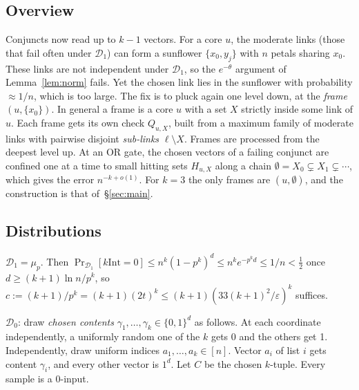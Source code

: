 \documentclass[11pt,a4paper]{article}
\theoremstyle{plain}
\theoremstyle{definition}
\theoremstyle{remark}
\newcommand{\kInt}{k\mathrm{Int}}
\newcommand{\Dz}{\mathcal{D}_0}
\newcommand{\Do}{\mathcal{D}_1}
\newcommand{\ones}{1^d}
\begin{document}
\subsection{Overview}
Conjuncts now read up to $k-1$ vectors. For a core $u$, the moderate links (those that fail often under $\Do$) can
form a sunflower $\{x_0,y_j\}$ with $n$ petals sharing $x_0$. These links are not independent under $\Do$, so the
$e^{-\theta}$ argument of Lemma~\ref{lem:norm} fails. Yet the chosen link lies in the sunflower with probability
$\approx1/n$, which is too large. The fix is to pluck again one level down, at the \emph{frame} $(u,\{x_0\})$.
In general a frame is a core $u$ with a set $X$ strictly inside some link of $u$. Each frame gets its own check
$Q_{u,X}$, built from a maximum family of moderate links with pairwise disjoint \emph{sub-links} $\ell\setminus X$.
Frames are processed from the deepest level up. At an OR gate, the chosen vectors of a failing conjunct are confined
one at a time to small hitting sets $H_{u,X}$ along a chain $\emptyset=X_0\subsetneq X_1\subsetneq\cdots$, which
gives the error $n^{-k+o(1)}$. For $k=3$ the only frames are $(u,\emptyset)$, and the construction is that
of~\S\ref{sec:main}.

\subsection{Distributions}
$\Do=\mu_p$. Then $\Pr_{\Do}[\kInt=0]\le n^k(1-p^k)^d\le n^ke^{-p^kd}\le1/n<\frac12$ once $d\ge(k+1)\ln n/p^k$, so
$c:=(k+1)/p^k=(k+1)(2t)^k\le(k+1)(33(k+1)^2/\varepsilon)^k$ suffices.

$\Dz$: draw \emph{chosen contents} $\gamma_1,\dots,\gamma_k\in\{0,1\}^d$ as follows. At each coordinate independently, a
uniformly random one of the $k$ gets 0 and the others get 1. Independently, draw uniform indices $a_1,\dots,a_k\in[n]$.
Vector $a_i$ of list $i$ gets content $\gamma_i$, and every other vector is $\ones$. Let $C$ be the chosen $k$-tuple. Every
sample is a 0-input.
\end{document}
